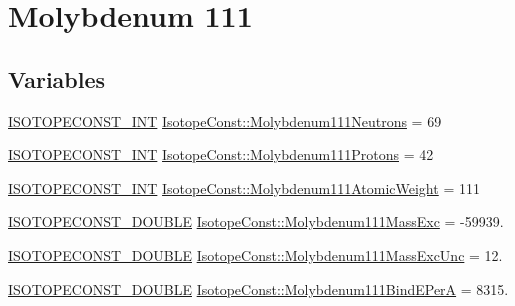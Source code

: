 \hypertarget{group___isotope_const-_molybdenum-_mo111}{}\section{Molybdenum 111}
\label{group___isotope_const-_molybdenum-_mo111}
\subsection*{Variables}
\begin{DoxyCompactItemize}
\item 
\mbox{\hyperlink{group___isotope_const-_macros_ga5f18360b3e99483a35c32d789e62621c}{I\+S\+O\+T\+O\+P\+E\+C\+O\+N\+S\+T\+\_\+\+I\+NT}} \mbox{\hyperlink{group___isotope_const-_molybdenum-_mo111_ga42c903b2906e77867947fbf14bae76ed}{Isotope\+Const\+::\+Molybdenum111\+Neutrons}} = 69
\item 
\mbox{\hyperlink{group___isotope_const-_macros_ga5f18360b3e99483a35c32d789e62621c}{I\+S\+O\+T\+O\+P\+E\+C\+O\+N\+S\+T\+\_\+\+I\+NT}} \mbox{\hyperlink{group___isotope_const-_molybdenum-_mo111_ga3678db9eda71b0d76e6f22a7eed8b796}{Isotope\+Const\+::\+Molybdenum111\+Protons}} = 42
\item 
\mbox{\hyperlink{group___isotope_const-_macros_ga5f18360b3e99483a35c32d789e62621c}{I\+S\+O\+T\+O\+P\+E\+C\+O\+N\+S\+T\+\_\+\+I\+NT}} \mbox{\hyperlink{group___isotope_const-_molybdenum-_mo111_gaace7c458f0a7886fef6432d38dc1534c}{Isotope\+Const\+::\+Molybdenum111\+Atomic\+Weight}} = 111
\item 
\mbox{\hyperlink{group___isotope_const-_macros_ga8f45a7272ce02c0b4c65c44636ed719a}{I\+S\+O\+T\+O\+P\+E\+C\+O\+N\+S\+T\+\_\+\+D\+O\+U\+B\+LE}} \mbox{\hyperlink{group___isotope_const-_molybdenum-_mo111_ga13e68de7f6d4d2555d77942a0a16f046}{Isotope\+Const\+::\+Molybdenum111\+Mass\+Exc}} = -\/59939.
\item 
\mbox{\hyperlink{group___isotope_const-_macros_ga8f45a7272ce02c0b4c65c44636ed719a}{I\+S\+O\+T\+O\+P\+E\+C\+O\+N\+S\+T\+\_\+\+D\+O\+U\+B\+LE}} \mbox{\hyperlink{group___isotope_const-_molybdenum-_mo111_gadec576fb420f9c67aba2d5c0d033251b}{Isotope\+Const\+::\+Molybdenum111\+Mass\+Exc\+Unc}} = 12.
\item 
\mbox{\hyperlink{group___isotope_const-_macros_ga8f45a7272ce02c0b4c65c44636ed719a}{I\+S\+O\+T\+O\+P\+E\+C\+O\+N\+S\+T\+\_\+\+D\+O\+U\+B\+LE}} \mbox{\hyperlink{group___isotope_const-_molybdenum-_mo111_gaf483060e674a7bbe7d1577c9f2b12e6d}{Isotope\+Const\+::\+Molybdenum111\+Bind\+E\+PerA}} = 8315.

\end{DoxyCompactItemize}
